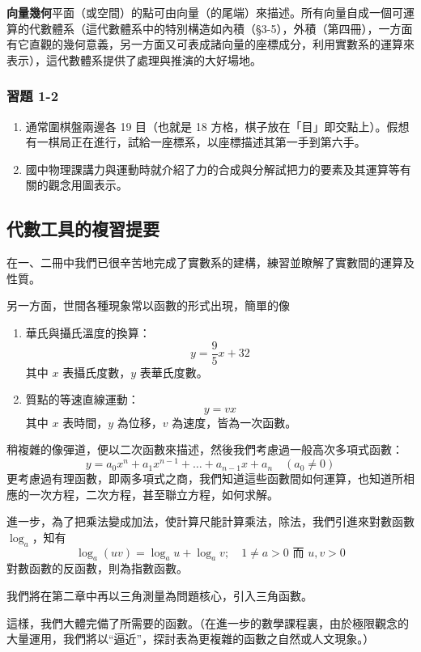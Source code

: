 \textbf{向量幾何}\quad 平面（或空間）的點可由向量（的尾端）來描述。所有向量自成一個可運算的代數體系（這代數體系中的特別構造如內積（§3-5），外積（第四冊），一方面有它直觀的幾何意義，另一方面又可表成諸向量的座標成分，利用實數系的運算來表示），這代數體系提供了處理與推演的大好場地。

\subsubsection*{習題 1-2}

\begin{enumerate}[label=\arabic*., leftmargin=2em]
  \item 通常圍棋盤兩邊各 19 目（也就是 18 方格，棋子放在「目」即交點上）。假想有一棋局正在進行，試給一座標系，以座標描述其第一手到第六手。
  \item 國中物理課講力與運動時就介紹了力的合成與分解試把力的要素及其運算等有關的觀念用圖表示。
\end{enumerate}

\subsection{代數工具的複習提要}
\label{subsec:b3-1-3}

在一、二冊中我們已很辛苦地完成了實數系的建構，練習並瞭解了實數間的運算及性質。

另一方面，世間各種現象常以函數的形式出現，簡單的像
\begin{enumerate}[label=(\arabic*), leftmargin=2em]
  \item 華氏與攝氏溫度的換算：
  \[ y = \frac{9}{5}x + 32 \]
  其中 $x$ 表攝氏度數，$y$ 表華氏度數。
  \item 質點的等速直線運動：
  \[ y = vx \]
  其中 $x$ 表時間，$y$ 為位移，$v$ 為速度，皆為一次函數。
\end{enumerate}

稍複雜的像彈道，便以二次函數來描述，然後我們考慮過一般高次多項式函數：
\[ y = a_0 x^n + a_1 x^{n-1} + \dots + a_{n-1} x + a_n \quad (a_0 \ne 0) \]
更考慮過有理函數，即兩多項式之商，我們知道這些函數間如何運算，也知道所相應的一次方程，二次方程，甚至聯立方程，如何求解。

進一步，為了把乘法變成加法，使計算尺能計算乘法，除法，我們引進來對數函數 $\log_a$，知有
\[ \log_a (uv) = \log_a u + \log_a v;\quad 1 \ne a > 0 \text{ 而 } u, v > 0 \]
對數函數的反函數，則為指數函數。

我們將在第二章中再以三角測量為問題核心，引入三角函數。

這樣，我們大體完備了所需要的函數。（在進一步的數學課程裏，由於極限觀念的大量運用，我們將以“逼近”，探討表為更複雜的函數之自然或人文現象。）

